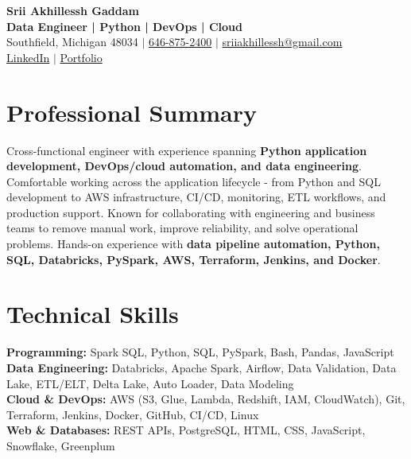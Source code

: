 \documentclass[letterpaper,10pt]{article}
\begin{document}
\fontsize{9.35pt}{10.45pt}\selectfont

\begin{center}
    {\LARGE \textbf{Srii Akhillessh Gaddam}} \\[-1pt]
    \textbf{Data Engineer | Python | DevOps | Cloud} \\[2pt]
    Southfield, Michigan 48034 $|$
    \href{tel:6468752400}{646-875-2400} $|$
    \href{mailto:sriiakhillessh@gmail.com}{sriiakhillessh@gmail.com} \\[1pt]
    \href{https://www.linkedin.com/in/srii-akhiilessh-gaddam-b48668191/}{LinkedIn} $|$
    \href{https://sriiakhillesshg.github.io/portfolio/}{Portfolio}
\end{center}
\vspace{-8pt}

\section{Professional Summary}
\small{Cross-functional engineer with experience spanning \textbf{Python application development, DevOps/cloud automation, and data engineering}. Comfortable working across the application lifecycle - from Python and SQL development to AWS infrastructure, CI/CD, monitoring, ETL workflows, and production support. Known for collaborating with engineering and business teams to remove manual work, improve reliability, and solve operational problems. Hands-on experience with \textbf{data pipeline automation, Python, SQL, Databricks, PySpark, AWS, Terraform, Jenkins, and Docker}.}

\section{Technical Skills}
\small{
\textbf{Programming:} Spark SQL, Python, SQL, PySpark, Bash, Pandas, JavaScript \\
\textbf{Data Engineering:} Databricks, Apache Spark, Airflow, Data Validation, Data Lake, ETL/ELT, Delta Lake, Auto Loader, Data Modeling \\
\textbf{Cloud \& DevOps:} AWS (S3, Glue, Lambda, Redshift, IAM, CloudWatch), Git, Terraform, Jenkins, Docker, GitHub, CI/CD, Linux \\
\textbf{Web \& Databases:} REST APIs, PostgreSQL, HTML, CSS, JavaScript, Snowflake, Greenplum
}
\end{document}

